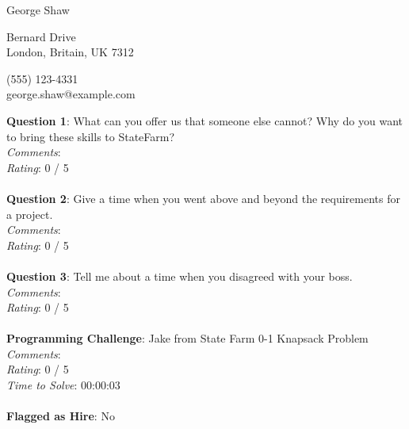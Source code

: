 \documentclass[12pt]{article}
\begin{document}
{\LARGE \begin{center}George Shaw\end{center}}

\begin{multicols}{2}
 Bernard Drive \\
London, Britain, UK 7312
\columnbreak

\noindent
(555) 123-4331 \\
george.shaw@example.com
\end{multicols}

\noindent
\textbf{Question 1}: What can you offer us that someone else cannot? Why do you want to bring these skills to StateFarm?
\\\noindent
\textit{Comments}: 
\\\noindent
\textit{Rating}: 0 / 5
\\\\
\noindent
\textbf{Question 2}: Give a time when you went above and beyond the requirements for a project.
\\\noindent
\textit{Comments}: 
\\\noindent
\textit{Rating}: 0 / 5
\\\\
\noindent
\textbf{Question 3}: Tell me about a time when you disagreed with your boss.
\\\noindent
\textit{Comments}: 
\\\noindent
\textit{Rating}: 0 / 5
\\\\
\noindent
\textbf{Programming Challenge}: Jake from State Farm 0-1 Knapsack Problem
\\\noindent
\textit{Comments}: 
\\\noindent
\textit{Rating}: 0 / 5
\\\noindent
\textit{Time to Solve}: 00:00:03
\\\\
\textbf{Flagged as Hire}: No
\\\\ 
\end{document}
